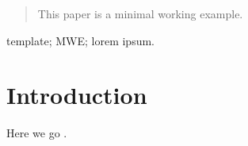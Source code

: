 \documentclass[conference,a4paper,flushend]{cs-techrep} %
\begin{document}
\selectlanguage{\cstechrepLang}
\maketitle
\begin{abstract}
This paper is a minimal working example.
\end{abstract}
\begin{IEEEkeywords}
template; MWE; lorem ipsum.
\end{IEEEkeywords}

\section{Introduction}
Here we go \cite{article-full}.

\sloppy
\printbibliography[notcategory=selfref]
\end{document}
